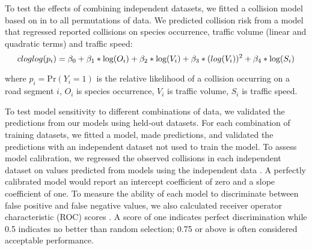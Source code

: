 To test the effects of combining independent datasets, we fitted a collision model based on  in  to all permutations of data.  We predicted collision risk from a model that regressed reported collisions on species occurrence, traffic volume (linear and quadratic terms) and traffic speed:
\begin{equation} \label{eq:61}
cloglog(p_i) = \beta_0 + \beta_1*\text{log}(O_i) + \beta_2*\text{log}(V_i) + \beta_3*\text({log}(V_i))^2 + \beta_4*\text{log}(S_i)
\end{equation}

\noindent where $p_i=\text{Pr}(Y_i=1)$ is the relative likelihood of a collision occurring on a road segment $i$, $O_i$ is species occurrence, $V_i$ is traffic volume, $S_i$ is traffic speed.

To test model sensitivity to different combinations of data, we validated the predictions from our models using held-out datasets. For each combination of training datasets, we fitted a model, made predictions, and validated the predictions with an independent dataset not used to train the model. To assess model calibration, we regressed the observed collisions in each independent dataset on values predicted from models using the independent data \citep[see][]{mill91}. A perfectly calibrated model would report an intercept coefficient of zero and a slope coefficient of one. To measure the ability of each model to discriminate between false positive and false negative values, we also calculated receiver operator characteristic (ROC) scores \citep[see][]{metz78}. A score of one indicates perfect discrimination while 0.5 indicates no better than random selection; 0.75 or above is often considered acceptable performance.

